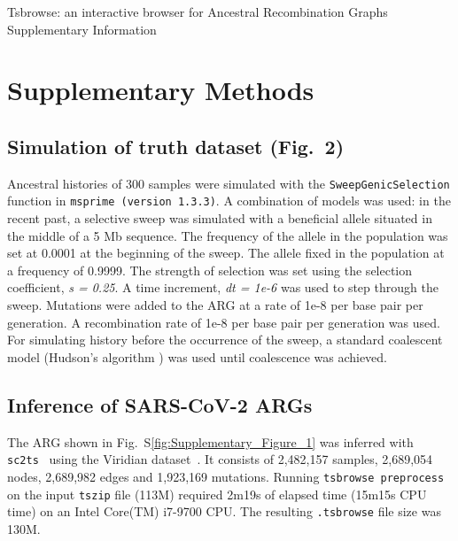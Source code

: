 \documentclass[unnumsec,webpdf,contemporary,large,namedate]{oup-authoring-template}
\begin{document}
\renewcommand{\figurename}{Fig.~S}
\begin{center}
    {\large Tsbrowse: an interactive browser for Ancestral Recombination Graphs}\\[1ex]
    {\large Supplementary Information}
\end{center}
\section{Supplementary Methods}
\subsection{Simulation of truth dataset (Fig.~2)}
\label{subsec:sweep_simulation}
Ancestral
histories of 300 samples were simulated with the \texttt{SweepGenicSelection}
function in \texttt{msprime (version 1.3.3)}. A combination of models was used:
in the recent past, a selective sweep was simulated with a beneficial allele
situated in the middle of a 5 Mb sequence. The frequency of the allele in the
population was set at 0.0001 at the beginning of the sweep. The allele fixed in
the population at a frequency of 0.9999. The strength of selection was set
using the selection coefficient, \textit{s = 0.25}. A time increment,
\textit{dt = 1e-6} was used to step through the sweep. Mutations were added to
the ARG at a rate of 1e-8 per base pair per generation. A recombination rate of 
1e-8 per base pair per generation was used. For simulating history before the occurrence 
of the sweep, a standard coalescent model (Hudson's algorithm \citep{Hudson1983}) was
used until coalescence was achieved.

\subsection{Inference of SARS-CoV-2 ARGs}
The ARG shown in Fig.~S\ref{fig:Supplementary_Figure_1} was inferred with
\texttt{sc2ts}~\citep{zhang2023biobank} using the Viridian
dataset~\citep{hunt2024addressing}. It consists of
2,482,157 samples, 
2,689,054 nodes,
2,689,982 edges
and
1,923,169 mutations.
Running \texttt{tsbrowse preprocess} on the input \texttt{tszip} file (113M)
required 2m19s of elapsed time (15m15s CPU time) on an Intel Core(TM) i7-9700 CPU.
The resulting \texttt{.tsbrowse} file size was 130M.
\end{document}
